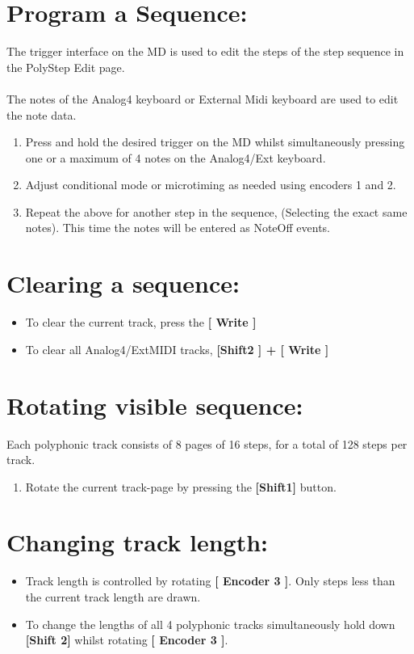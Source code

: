 \section{Program a Sequence: }
The trigger interface on the MD is used to edit the steps of the step sequence in the PolyStep Edit page.\\
\\
The notes of the Analog4 keyboard or External Midi keyboard are used to edit the note data.
\\
\begin{enumerate}
\item Press and hold the desired trigger on the MD whilst simultaneously pressing one or a maximum of 4 notes on the Analog4/Ext keyboard.
\item Adjust conditional mode or microtiming as needed using encoders 1 and 2.
\item Repeat the above for another step in the sequence, (Selecting the exact same notes). This time the notes will be entered as NoteOff events.
\end{enumerate}

\section{Clearing a sequence:}
\begin{itemize}
\item To clear the current track, press the\textbf{ [ Write ] }
\item To clear all Analog4/ExtMIDI tracks, \textbf{[Shift2 ] + [ Write ]}
\end{itemize}
\section{Rotating visible sequence:}
Each polyphonic track consists of 8 pages of 16 steps, for a total of 128 steps per track.
\begin{enumerate}
	\item Rotate the current track-page by pressing the \textbf{[Shift1] }button.
\end{enumerate}
\section{Changing track length:}
\begin{itemize}
	\item Track length is controlled by rotating \textbf{[ Encoder 3 ]}. Only steps less than the current track length are drawn.
	\item To change the lengths of all 4 polyphonic tracks simultaneously hold down \textbf{[Shift 2]} whilst rotating \textbf{[ Encoder 3 ]}.
\end{itemize}
